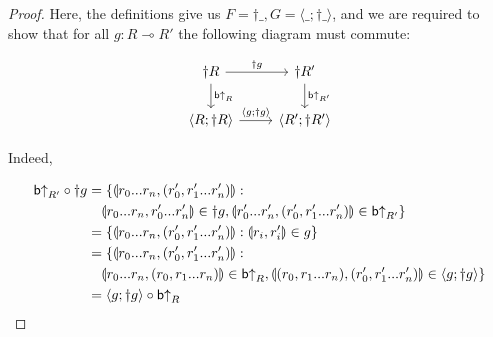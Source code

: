 \documentclass[11pt, oneside]{article}
\theoremstyle{plain}
\theoremstyle{definition}
\let\originaldagger\dagger
\renewcommand{\dag}{\mathord{\originaldagger}}
\newcommand{\la}{\langle}
\newcommand{\ra}{\rangle}
\newcommand{\lp}{\llparenthesis}
\newcommand{\rp}{\rrparenthesis}
\newcommand{\comp}{\mathbin{\circ}}
\begin{document}
\begin{proof}
Here, the definitions give us $F = \dag\_, G = \la\_;\dag\_\ra$, and we are required to show that for all $g:R\multimap R'$ the following diagram must commute:

\[
\begin{tikzcd}
    \dag R \arrow[r,"\dag g"]\arrow[d,"\bU_{R}"]& \dag R' \arrow[d,"\bU_{R'}"] \\
    \la R; \dag R\ra \arrow[r,"\la g;\dag g\ra"] & \la R';\dag R'\ra
\end{tikzcd}
\]

Indeed,

\begin{align*}
\bU_{R'}\comp\dag g &= \{\lp r_0...r_n,(r'_0,r'_1...r'_n)\rp: \\
&\quad\lp r_0...r_n,r'_0...r'_n\rp\in\dag g,\lp r'_0...r'_n,(r'_0,r'_1...r'_n)\rp\in\bU_{R'}\} \\
&= \{\lp r_0...r_n,(r'_0,r'_1...r'_n)\rp:\lp r_i,r'_i\rp\in g\} \\
&= \{\lp r_0...r_n,(r'_0,r'_1...r'_n)\rp: \\
&\quad\lp r_0...r_n,(r_0,r_1...r_n)\rp\in\bU_{R},\lp(r_0,r_1...r_n),(r'_0,r'_1...r'_n)\rp\in\la g;\dag g\ra\} \\
&= \la g;\dag g\ra\comp\bU_{R}
\end{align*}
\end{proof}
\end{document}
